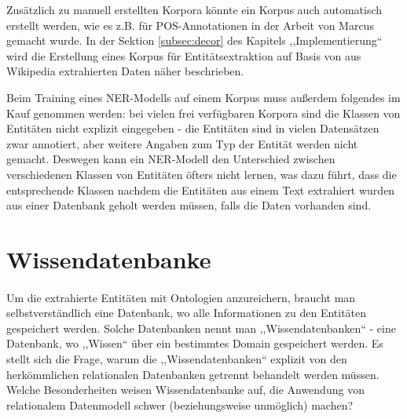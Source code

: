 Zusätzlich zu manuell erstellten Korpora könnte ein Korpus auch automatisch erstellt werden, wie es z.B. für POS-Annotationen in der Arbeit von Marcus\cite{marcus1993building} gemacht wurde. In der Sektion \ref{subsec:decor} des Kapitels ,,Implementierung`` wird die Erstellung eines Korpus für Entitätsextraktion auf Basis von aus Wikipedia extrahierten Daten näher beschrieben.

Beim Training eines NER-Modells auf einem Korpus muss außerdem folgendes im Kauf genommen werden: bei vielen frei verfügbaren Korpora sind die Klassen von Entitäten nicht explizit eingegeben - die Entitäten sind in vielen Datensätzen zwar annotiert, aber weitere Angaben zum Typ der Entität werden nicht gemacht. Deswegen kann ein NER-Modell den Unterschied zwischen verschiedenen Klassen von Entitäten öfters nicht lernen, was dazu führt, dass die entsprechende Klassen nachdem die Entitäten aus einem Text extrahiert wurden aus einer Datenbank geholt werden müssen, falls die Daten vorhanden sind.

\section{Wissendatenbanke} \label{sec:wiss}
\paragraph{}
Um die extrahierte Entitäten mit Ontologien anzureichern, braucht man selbstverständlich eine Datenbank, wo alle Informationen zu den Entitäten gespeichert werden. Solche Datenbanken nennt man ,,Wissendatenbanken`` - eine Datenbank, wo ,,Wissen`` über ein bestimmtes Domain gespeichert werden. Es stellt sich die Frage, warum die ,,Wissendatenbanken`` explizit von den herkömmlichen relationalen Datenbanken getrennt behandelt werden müssen. Welche Besonderheiten weisen Wissendatenbanke auf, die Anwendung von relationalem Datenmodell schwer (beziehungsweise unmöglich) machen?

